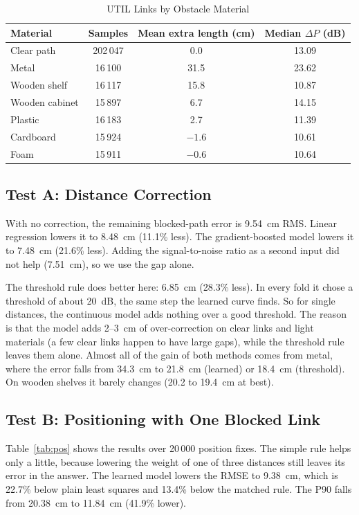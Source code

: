 \documentclass[conference]{IEEEtran}
\begin{document}
\begin{table}[htbp]
\caption{UTIL Links by Obstacle Material}
\label{tab:materials}
\centering
\begin{tabular}{lccc}
\toprule
\textbf{Material} & \textbf{Samples} & \textbf{Mean extra length (cm)} & \textbf{Median $\Delta P$ (dB)} \\
\midrule
Clear path     & 202\,047 & 0.0  & 13.09 \\
Metal          & 16\,100  & 31.5 & 23.62 \\
Wooden shelf   & 16\,117  & 15.8 & 10.87 \\
Wooden cabinet & 15\,897  & 6.7  & 14.15 \\
Plastic        & 16\,183  & 2.7  & 11.39 \\
Cardboard      & 15\,924  & $-1.6$ & 10.61 \\
Foam           & 15\,911  & $-0.6$ & 10.64 \\
\bottomrule
\end{tabular}
\end{table}

\subsection{Test A: Distance Correction}
With no correction, the remaining blocked-path error is 9.54~cm RMS. Linear
regression lowers it to 8.48~cm (11.1\% less). The gradient-boosted model
lowers it to 7.48~cm (21.6\% less). Adding the signal-to-noise ratio as a
second input did not help (7.51~cm), so we use the gap alone.

The threshold rule does better here: 6.85~cm (28.3\% less). In every fold it
chose a threshold of about 20~dB, the same step the learned curve finds. So
for single distances, the continuous model adds nothing over a good
threshold. The reason is that the model adds 2--3~cm of over-correction on
clear links and light materials (a few clear links happen to have large
gaps), while the threshold rule leaves them alone. Almost all of the gain of
both methods comes from metal, where the error falls from 34.3~cm to 21.8~cm
(learned) or 18.4~cm (threshold). On wooden shelves it barely changes (20.2
to 19.4~cm at best).

\subsection{Test B: Positioning with One Blocked Link}
Table~\ref{tab:pos} shows the results over 20\,000 position fixes. The
simple rule helps only a little, because lowering the weight of one of
three distances still leaves its error in the answer. The learned model
lowers the RMSE to 9.38~cm, which is 22.7\% below plain least squares and
13.4\% below the matched rule. The P90 falls from 20.38~cm to 11.84~cm
(41.9\% lower).
\end{document}
